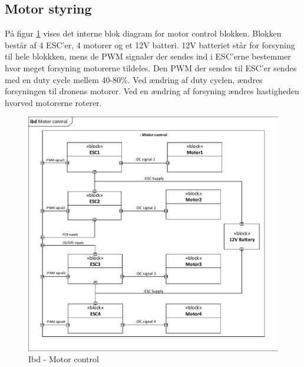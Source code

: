 \subsection{Motor styring}

På figur \ref{fig:ibd_motorcontrol} vises det interne blok diagram for motor control blokken. Blokken består af 4 ESC'er, 4 motorer og et 12V batteri. 12V batteriet står for forsyning til hele blokkken, mens de PWM signaler der sendes ind i ESC'erne bestemmer hvor meget forsyning motorerne tildeles. Den PWM der sendes til ESC'er sendes med en duty cycle mellem 40-80\%. Ved ændring af duty cyclen, ændres forsyningen til dronens motorer. Ved en ændring af forsyning ændres hastigheden hvorved motorerne roterer.

\begin{figure}[H]
\centering
\includegraphics[width=1\textwidth]{Billeder/IBD/ibd6_motorcontrol.pdf}
\vspace{-0.5cm}
\caption{Ibd - Motor control}
\label{fig:ibd_motorcontrol}
\end{figure}

